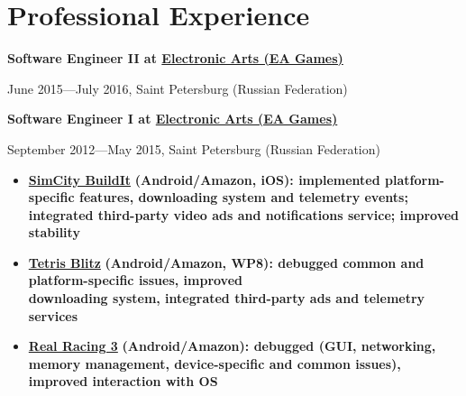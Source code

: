 \section*{Professional Experience}

{
\fontsize{12pt}{12pt}\selectfont
\bfseries Software Engineer II at
\href{http://www.ea.com}{Electronic Arts (EA Games)}
\mdseries
}

{
\fontsize{9pt}{8pt}\selectfont
June 2015---July 2016, Saint Petersburg (Russian Federation)
}


\vspace{0.2cm}

{
\fontsize{12pt}{12pt}\selectfont
\bfseries Software Engineer I at
\href{http://www.ea.com}{Electronic Arts (EA Games)}
\mdseries
}

{
\fontsize{9pt}{8pt}\selectfont
September 2012---May 2015, Saint Petersburg (Russian Federation)
}

\vspace{0.2cm}

\begin{itemize}[rightmargin=\dimexpr\linewidth-18cm-\leftmargin\relax]
\item
    \href{http://www.ea.com/simcity-buildit}
        {\bfseries SimCity BuildIt\mdseries}
        \bfseries (Android/Amazon, iOS)\mdseries:
        implemented platform-specific features,
        downloading system
        and telemetry events;
        integrated third-party video ads and notifications service;
        improved stability
\item
    \href{http://www.tetrisblitz.com}
        {\bfseries Tetris Blitz\mdseries}
        \bfseries(Android/Amazon, WP8)\mdseries:
        debugged common and platform-specific issues,
        improved \\ downloading system,
        integrated third-party ads and telemetry services
\item
    \href{http://www.ea.com/real-racing-3}
        {\bfseries Real Racing 3\mdseries}
        \bfseries (Android/Amazon)\mdseries:
        debugged (GUI, networking, memory management, device-specific and common issues),
        improved interaction with OS
\end{itemize}

